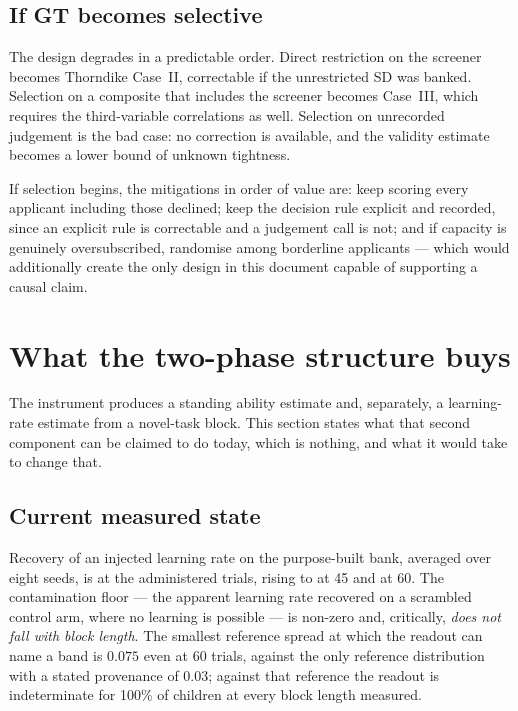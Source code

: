 \documentclass[11pt,a4paper]{article}
\begin{document}
\subsection{If GT becomes selective}

The design degrades in a predictable order. Direct restriction on the screener
becomes Thorndike Case~II, correctable if the unrestricted SD was banked.
Selection on a composite that includes the screener becomes Case~III, which
requires the third-variable correlations as well. Selection on unrecorded
judgement is the bad case: no correction is available, and the validity estimate
becomes a lower bound of unknown tightness.

If selection begins, the mitigations in order of value are: keep scoring every
applicant including those declined; keep the decision rule explicit and
recorded, since an explicit rule is correctable and a judgement call is not; and
if capacity is genuinely oversubscribed, randomise among borderline applicants
--- which would additionally create the only design in this document capable of
supporting a causal claim.


\section{What the two-phase structure buys}
\label{sec:twophase}

The instrument produces a standing ability estimate and, separately, a
learning-rate estimate from a novel-task block. This section states what that
second component can be claimed to do today, which is nothing, and what it would
take to change that.

\subsection{Current measured state}

Recovery of an injected learning rate on the purpose-built bank, averaged over
eight seeds, is \RecoveryThirty{} at the administered \BlockAdministered{}
trials, rising to \RecoveryFortyFive{} at 45 and \RecoverySixty{} at 60. The
contamination floor --- the apparent learning rate recovered on a scrambled
control arm, where no learning is possible --- is non-zero and, critically,
\emph{does not fall with block length}. The smallest reference spread at which
the readout can name a band is $0.075$ even at 60 trials, against the only
reference distribution with a stated provenance of $0.03$; against that
reference the readout is indeterminate for 100\% of children at every block
length measured.
\end{document}
